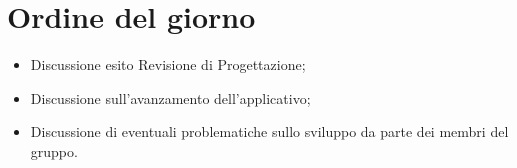 \section{Ordine del giorno}
\begin{itemize}
\item Discussione esito Revisione di Progettazione;
\item Discussione sull'avanzamento dell'applicativo;
\item Discussione di eventuali problematiche sullo sviluppo da parte dei membri del gruppo.
\end{itemize}